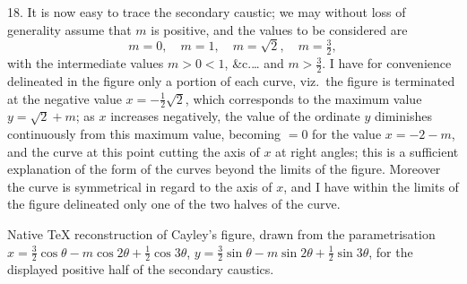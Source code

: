 \documentclass[11pt,a4paper]{article}
\theoremstyle{plain}
\begin{document}
18. It is now easy to trace the secondary caustic; we may without loss of generality assume that $m$ is positive, and the values to be considered are
\[
m = 0, \quad m = 1, \quad m = \sqrt{2}, \quad m = \tfrac32,
\]
with the intermediate values $m > 0 < 1$, \&c.\ldots{} and $m > \frac32$.
I have for convenience delineated in the figure only a portion of each curve,
viz.\ the figure is terminated at the negative value
$x = -\tfrac12\sqrt{2}$, which corresponds to the maximum value
$y = \sqrt{2} + m$; as $x$ increases negatively, the value of the ordinate
$y$ diminishes continuously from this maximum value, becoming $= 0$ for the
value $x = -2 - m$, and the curve at this point cutting the axis of $x$ at
right angles; this is a sufficient explanation of the form of the curves
beyond the limits of the figure. Moreover the curve is symmetrical in regard
to the axis of $x$, and I have within the limits of the figure delineated only
one of the two halves of the curve.

\begin{center}

\smallskip
\footnotesize Native TeX reconstruction of Cayley's figure, drawn from the
parametrisation
$x=\tfrac32\cos\theta-m\cos2\theta+\tfrac12\cos3\theta$,
$y=\tfrac32\sin\theta-m\sin2\theta+\tfrac12\sin3\theta$,
for the displayed positive half of the secondary caustics.
\end{center}
\end{document}
